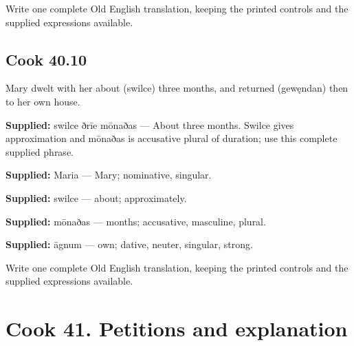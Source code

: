 Write one complete Old English translation, keeping the printed controls and the supplied expressions available.

\par\begin{minipage}{\linewidth}\raggedright
\subsection*{Cook 40.10}

Mary dwelt with her about (swilce) three months, and returned (gewęndan) then to her own house.

\end{minipage}\par\addvspace{4pt}

\textbf{Supplied:} swilce ðrīe mōnaðas — About three months. Swilce gives approximation and mōnaðas is accusative plural of duration; use this complete supplied phrase.

\textbf{Supplied:} Maria — Mary; nominative, singular.

\textbf{Supplied:} swilce — about; approximately.

\textbf{Supplied:} mōnaðas — months; accusative, masculine, plural.

\textbf{Supplied:} āgnum — own; dative, neuter, singular, strong.

Write one complete Old English translation, keeping the printed controls and the supplied expressions available.

\section*{Cook 41. Petitions and explanation}

